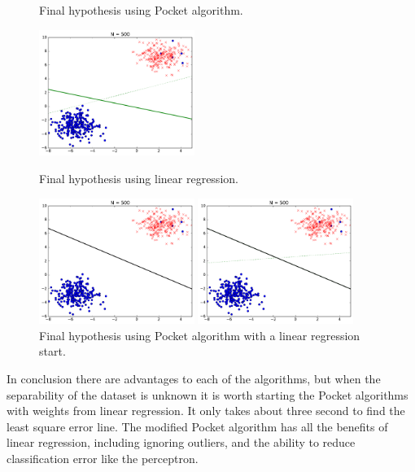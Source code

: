 \documentclass[a4paper]{article}
\begin{document}
\begin {description}
\begin{doublespace}
\begin{figure}
  \centering
   \caption{Final hypothesis using Pocket algorithm.}
    \includegraphics[width=0.45\textwidth]{Outliers/pocket_learning.pdf}
    \bigskip
     \caption{Final hypothesis using linear regression.}
    \includegraphics[width=0.45\textwidth]{Outliers/linear_regression.pdf}
    \bigskip
    \caption{Final hypothesis using Pocket algorithm with a linear regression start.}\includegraphics[width=0.45\textwidth]{Outliers/pocket_with_lr.pdf}
     
\end{figure}

In conclusion there are advantages to each of the algorithms, but when the separability of the dataset is unknown it is worth starting the Pocket algorithms with weights from linear regression. It only takes about three second to find the least square error line. The modified Pocket algorithm has all the benefits of linear regression, including ignoring outliers, and the ability to reduce classification error like the perceptron.
\end{doublespace}
\end {description}
\end{document}
